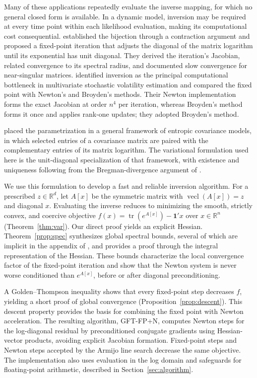 \documentclass[11pt]{article}
\newcommand{\R}{\mathbb{R}}
\newcommand{\tr}{\operatorname{tr}}
\newcommand{\vecl}{\operatorname{vecl}}
\newcommand{\one}{\mathbf{1}}
\begin{document}
Many of these applications repeatedly evaluate the inverse mapping, for which no general closed form is available. In a dynamic model, inversion may be required at every time point within each likelihood evaluation, making its computational cost consequential. \citet{ArchakovHansen:Correlation} established the bijection through a contraction argument and proposed a fixed-point iteration that adjusts the diagonal of the matrix logarithm until its exponential has unit diagonal. They derived the iteration's Jacobian, related convergence to its spectral radius, and documented slow convergence for near-singular matrices. \citet{ChenFeiYu:2025} identified inversion as the principal computational bottleneck in multivariate stochastic volatility estimation and compared the fixed point with Newton's and Broyden's methods. Their Newton implementation forms the exact Jacobian at order $n^{4}$ per iteration, whereas Broyden's method forms it once and applies rank-one updates; they adopted Broyden's method.

\citet{Zwiernik:2025} placed the parametrization in a general framework of entropic covariance models, in which selected entries of a covariance matrix are paired with the complementary entries of its matrix logarithm. The variational formulation used here is the unit-diagonal specialization of that framework, with existence and uniqueness following from the Bregman-divergence argument of \citet[Theorem~5.4]{Zwiernik:2025}.

We use this formulation to develop a fast and reliable inversion algorithm. For a prescribed $z\in\R^{d}$, let $A[x]$ be the symmetric matrix with $\vecl(A[x])=z$ and diagonal $x$. Evaluating the inverse reduces to minimizing the smooth, strictly convex, and coercive objective $f(x)=\tr(e^{A[x]})-\one'x$ over $x\in\R^{n}$ (Theorem~\ref{thm:var}). Our direct proof yields an explicit Hessian. Theorem~\ref{prop:spec} synthesizes global spectral bounds, several of which are implicit in the appendix of \citet{ArchakovHansen:Correlation}, and provides a proof through the integral representation of the Hessian. These bounds characterize the local convergence factor of the fixed-point iteration and show that the Newton system is never worse conditioned than $e^{A[x]}$, before or after diagonal preconditioning.

A Golden--Thompson inequality shows that every fixed-point step decreases $f$, yielding a short proof of global convergence (Proposition~\ref{prop:descent}). This descent property provides the basis for combining the fixed point with Newton acceleration. The resulting algorithm, GFT-FP+N, computes Newton steps for the log-diagonal residual by preconditioned conjugate gradients using Hessian-vector products, avoiding explicit Jacobian formation. Fixed-point steps and Newton steps accepted by the Armijo line search decrease the same objective. The implementation also uses evaluation in the log domain and safeguards for floating-point arithmetic, described in Section~\ref{sec:algorithm}.
\end{document}
